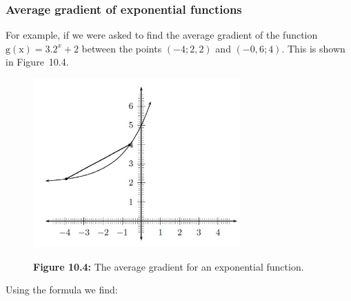             \subsubsection{ Average gradient of exponential functions}
            \nopagebreak
\label{m39223*id734}For example, if we were asked to find the average gradient of the function $\mathrm{g\left(x\right)}=3.{2}^{x}+2$ between the points \begin{math}\left(-4;\mathrm{2,2}\right)\end{math} and \begin{math}\left(-0,6;4\right)\end{math}. This is shown in Figure~10.4. 
    \setcounter{subfigure}{0}
	\begin{figure}[H] %
    \begin{center}
    \label{m39223*uid31!!!underscore!!!media}\label{m39223*uid31!!!underscore!!!printimage}\includegraphics[width=300px]{col11306.imgs/m39223_exponent.png} %
      \vspace{2pt}
    \vspace{\rubberspace}\par \begin{cnxcaption}
	  \small \textbf{Figure 10.4: }The average gradient for an exponential function.
	\end{cnxcaption}
    \vspace{.1in}
    \end{center}
 \end{figure}       
Using the formula we find:
 \label{m39223*id193486}\nopagebreak\noindent{}
